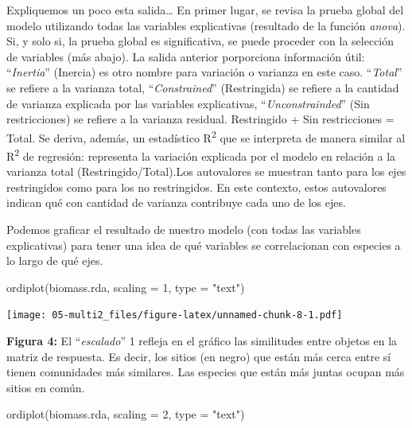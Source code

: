 \documentclass[
]{book}
\newenvironment{Shaded}{\begin{snugshade}}{\end{snugshade}}
\newcommand{\AttributeTok}[1]{\textcolor[rgb]{0.77,0.63,0.00}{#1}}
\newcommand{\DecValTok}[1]{\textcolor[rgb]{0.00,0.00,0.81}{#1}}
\newcommand{\FunctionTok}[1]{\textcolor[rgb]{0.00,0.00,0.00}{#1}}
\newcommand{\NormalTok}[1]{#1}
\newcommand{\StringTok}[1]{\textcolor[rgb]{0.31,0.60,0.02}{#1}}
\begin{document}
Expliquemos un poco esta salida\ldots{}
En primer lugar, se revisa la prueba global del modelo utilizando todas las variables explicativas (resultado de la función \emph{anova}). Si, y solo si, la prueba global es significativa, se puede proceder con la selección de variables (más abajo).
La salida anterior porporciona información útil: ``\emph{Inertia}'' (Inercia) es otro nombre para variación o varianza en este caso. ``\emph{Total}'' se refiere a la varianza total, ``\emph{Constrained}'' (Restringida) se refiere a la cantidad de varianza explicada por las variables explicativas, ``\emph{Unconstrainded}'' (Sin restricciones) se refiere a la varianza residual. Restringido + Sin restricciones = Total. Se deriva, además, un estadístico R\textsuperscript{2} que se interpreta de manera similar al R\textsuperscript{2} de regresión: representa la variación explicada por el modelo en relación a la varianza total (Restringido/Total).Los autovalores se muestran tanto para los ejes restringidos como para los no restringidos. En este contexto, estos autovalores indican qué con cantidad de varianza contribuye cada uno de los ejes.

Podemos graficar el resultado de nuestro modelo (con todas las variables explicativas) para tener una idea de qué variables se correlacionan con especies a lo largo de qué ejes.

\begin{Shaded}
\begin{Highlighting}[]
\FunctionTok{ordiplot}\NormalTok{(biomass.rda, }\AttributeTok{scaling =} \DecValTok{1}\NormalTok{, }\AttributeTok{type =} \StringTok{"text"}\NormalTok{)}
\end{Highlighting}
\end{Shaded}

\texttt{[image: 05-multi2\_files/figure-latex/unnamed-chunk-8-1.pdf]}

\textbf{Figura 4:} El ``\emph{escalado}'' 1 refleja en el gráfico las similitudes entre objetos en la matriz de respuesta. Es decir, los sitios (en negro) que están más cerca entre sí tienen comunidades más similares. Las especies que están más juntas ocupan más sitios en común.

\begin{Shaded}
\begin{Highlighting}[]
\FunctionTok{ordiplot}\NormalTok{(biomass.rda, }\AttributeTok{scaling =} \DecValTok{2}\NormalTok{, }\AttributeTok{type =} \StringTok{"text"}\NormalTok{)}
\end{Highlighting}
\end{Shaded}
\end{document}
